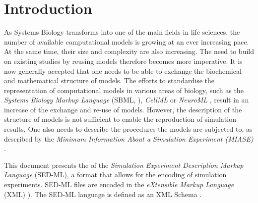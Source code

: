 \section{Introduction}

As Systems Biology transforms into one of the main fields in life sciences, the number of available computational models is growing at an ever increasing pace. At the same time, their size and complexity are also increasing. The need to build on existing studies by reusing models therefore becomes more imperative. It is now generally accepted that one needs to be able to exchange the biochemical and mathematical structure of models. The efforts to standardise the representation of computational models in various areas of biology, such as the \emph{Systems Biology Markup Language} (SBML, \citet{Hucka:2003}), \emph{CellML} \citet{Lloyd:2004} or \emph{NeuroML} \citet{Goddard:2001}, result in an increase of the exchange and re-use of models. However, the description of the structure of models is not sufficient to enable the reproduction of simulation results. 
One also needs to describe the procedures the models are subjected to, as described by the 
\emph{Minimum Information About a Simulation Experiment (MIASE)} \citep{Waltemath:2010}. 

This document presents the \LoneVone
 of the \emph{Simulation Experiment Description Markup Language} (SED-ML), a format that allows for the encoding of simulation experiments. SED-ML files are encoded in the \emph{eXtensible Markup Language} (XML) \citep{Bray:2006}). The SED-ML language is defined as an XML Schema \citep{Fallside:2001}. 

